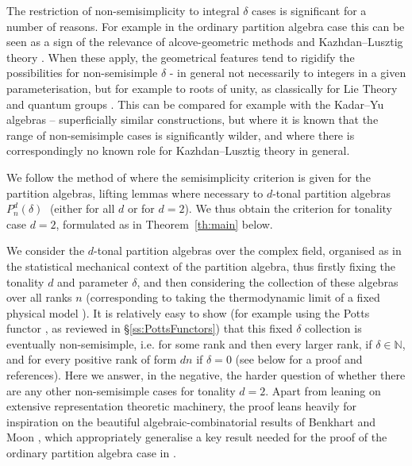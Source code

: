 \documentclass[reqno,10pt,a4paper]{amsart}
\newcommand{\N}{\mathbb{N}}
\newcommand{\nk}{n}  %
\newcommand{\dl}{d}  %
\newcommand{\dell}{\dl}  %
\newcommand{\PP}{P_\nk^\dl(\delta)} %
\begin{document}
\medskip 

The restriction of non-semisimplicity to integral $\delta$ cases is 
significant for a number of reasons. For example in the ordinary partition algebra case this can be seen as 
a %
sign of the relevance of alcove-geometric methods and Kazhdan--Lusztig theory 
\cite{MartinWoodcock98}.
When these apply, 
the geometrical features tend to rigidify the possibilities for non-semisimple $\delta$ - in general not necessarily to integers in a given parameterisation, but for example to roots of unity, as classically for Lie Theory and quantum groups \cite{AndersenJantzenSoergel94,Soergel97a}. 
This 
can  %
be compared for example with the Kadar--Yu algebras \cite{KadarMartinYu12} -- superficially similar constructions, but where it is known that the range of non-semisimple cases is 
significantly  %
wilder, and where there is correspondingly no known role for Kazhdan--Lusztig theory in general. 

\medskip 

We follow 
the method of 
\cite{MartinSaleur94b} %
where the semisimplicity criterion is given
for the partition algebras,
lifting 
lemmas where necessary to $\dell$-tonal partition algebras  
$\PP \;$
(either for all $d$ or for $d=2$).
We thus obtain the criterion 
for tonality case $d=2$, formulated 
as in Theorem~\ref{th:main}
below.

\medskip 

We consider the $\dl$-tonal partition algebras
over the complex field, 
organised as in the statistical mechanical context of the partition algebra, thus  %
firstly fixing the tonality $\dl$ and 
parameter $\delta$, 
and then considering the collection of these algebras over all ranks $\nk$
(corresponding to taking the thermodynamic limit of a fixed physical model \cite{Martin91}). 
It is 
relatively 
easy to show 
(for example using the Potts functor \cite{Martin91,Martin08a}, as  reviewed in \S\ref{ss:PottsFunctors})
that this 
fixed $\delta$ collection is eventually 
non-semisimple,
i.e. for some rank and then every larger rank,
if $\delta \in \N$,
and for every positive rank of form $\dl  n$  if $\delta=0$
(see below for a proof and references).
Here we answer, 
in the negative, 
the 
harder question of whether there are any 
other non-semisimple cases  %
for tonality $\dl =2$.
Apart from leaning on extensive representation theoretic machinery, 
the proof leans heavily 
for inspiration 
on 
the 
beautiful algebraic-combinatorial 
results of Benkhart and Moon \cite{benkart2012planar,benkart2017walks},
which 
appropriately 
generalise a key result needed for the proof of the 
ordinary partition algebra case in \cite{MartinSaleur94b}.
\end{document}
